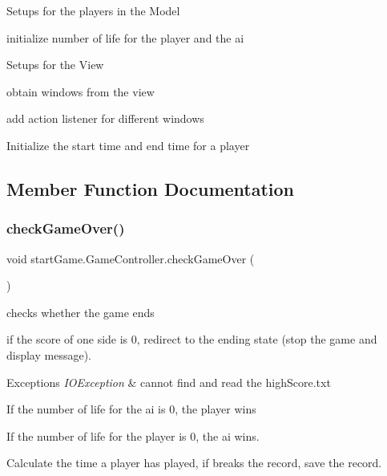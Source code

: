 Setups for the players in the Model
\begin{DoxyItemize}
\item initialize number of life for the player and the ai
\end{DoxyItemize}

Setups for the View
\begin{DoxyItemize}
\item obtain windows from the view
\item add action listener for different windows
\end{DoxyItemize}

Initialize the start time and end time for a player

\subsection{Member Function Documentation}
\hypertarget{classstart_game_1_1_game_controller_a3e2fb04603f5a7482672b3b5d1afe568}{}\label{classstart_game_1_1_game_controller_a3e2fb04603f5a7482672b3b5d1afe568} 
\subsubsection{\texorpdfstring{check\+Game\+Over()}{checkGameOver()}}
{\footnotesize\ttfamily void start\+Game.\+Game\+Controller.\+check\+Game\+Over (\begin{DoxyParamCaption}{ }\end{DoxyParamCaption})\hspace{0.3cm}{\ttfamily [private]}}



checks whether the game ends 

if the score of one side is 0, redirect to the ending state (stop the game and display message). 
\begin{DoxyExceptions}{Exceptions}
{\em I\+O\+Exception} & cannot find and read the high\+Score.\+txt \\
\hline
\end{DoxyExceptions}

\begin{DoxyItemize}
\item If the number of life for the ai is 0, the player wins
\item If the number of life for the player is 0, the ai wins.
\item Calculate the time a player has played, if breaks the record, save the record.
\end{DoxyItemize}\hypertarget{classstart_game_1_1_game_controller_abe07c8d60c3adbb0993e637b8c725884}{}\label{classstart_game_1_1_game_controller_abe07c8d60c3adbb0993e637b8c725884} 
